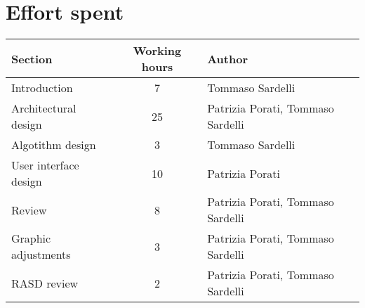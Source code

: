 \pagebreak

\section{Effort spent}

\begin{center}
	\vspace{0.1cm}
	\begin{tabular}{ l c l } 
		\hline
		Section 					& Working hours 	& Author \\ 
		\hline
		Introduction				& 7 				& Tommaso Sardelli	\\
		Architectural design		& 25 				& Patrizia Porati, Tommaso Sardelli	\\
		Algotithm design	 		& 3				 	& Tommaso Sardelli \\ 
		User interface design		& 10 				& Patrizia Porati	\\
		Review						& 8					& Patrizia Porati, Tommaso Sardelli \\
		Graphic adjustments			& 3 				& Patrizia Porati, Tommaso Sardelli \\
		RASD review					& 2 				& Patrizia Porati, Tommaso Sardelli \\
		\hline
	\end{tabular}
	\vspace{0.4cm}
\end{center}
